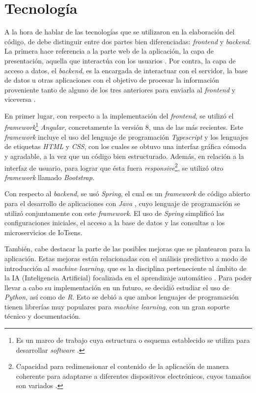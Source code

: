 \documentclass[pdftex,11pt,a4paper]{book}
\begin{document}
\section{Tecnología} \label{seccion:tecnologia}

A la hora de hablar de las tecnologías que se utilizaron en la elaboración del código, de debe distinguir entre dos partes bien diferenciadas: \textit{frontend} y \textit{backend}. La primera hace referencia a la parte web de la aplicación, la capa de presentación, aquella que interactúa con los usuarios \cite{bib:front-end}. Por contra, la capa de acceso a datos, el \textit{backend}, es la encargada de interactuar con el servidor, la base de datos u otras aplicaciones con el objetivo de procesar la información proveniente tanto de alguno de los tres anteriores para enviarla al \textit{frontend} y viceversa \cite{bib:frontendybackend}.

En primer lugar, con respecto a la implementación del \textit{frontend}, se utilizó el \textit{framework}\footnote{Es un marco de trabajo cuya estructura o esquema establecido se utiliza para desarrollar \textit{software} \cite{bib:framework}.} \textit{Angular}, concretamente la versión 8, una de las más recientes. Este \textit{framework} incluye el uso del lenguaje de programación \textit{Typescript} y los lenguajes de etiquetas \textit{HTML} y \textit{CSS}, con los cuales se obtuvo una interfaz gráfica cómoda y agradable, a la vez que un código bien estructurado. Además, en relación a la interfaz de usuario, para lograr que ésta fuera \textit{responsive}\footnote{Capacidad para redimensionar el contenido de la aplicación de manera coherente para adaptarse a diferentes dispositivos electrónicos, cuyos tamaños son variados \cite{bib:responsive}.}, se utilizó otro \textit{framework} llamado \textit{Bootstrap}.

Con respecto al \textit{backend}, se usó \textit{Spring}, el cual es un \textit{framework} de código abierto para el desarrollo de aplicaciones con \textit{Java} \cite{bib:spring}, cuyo lenguaje de programación se utilizó conjuntamente con este \textit{framework}. El uso de \textit{Spring} simplificó las configuraciones iniciales, el acceso a la base de datos y las consultas a los microservicios de IoTsens.  

También, cabe destacar la parte de las posibles mejoras que se plantearon para la aplicación. Estas mejoras están relacionadas con el análisis predictivo a modo de introducción al \textit{machine learning}, que es la disciplina perteneciente al ámbito de la IA (Inteligencia Artificial) focalizada en el aprendizaje automático \cite{bib:machine-learning}. Para poder llevar a cabo su implementación en un futuro, se decidió estudiar el uso de \textit{Python}, así como de \textit{R}. Esto se debió a que ambos lenguajes de programación tienen librerías muy populares para \textit{machine learning}, con un gran soporte técnico y documentación.
\end{document}
